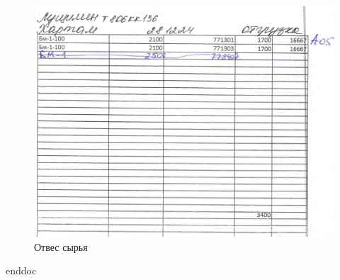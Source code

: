 \begin{figure}
\begin{center}
\includegraphics[height=0.94\textheight, width=\textwidth, angle=90, keepaspectratio]{Pics/f9.jpg}
\end{center}
\caption{Отвес сырья}
\label{pic:f9}
\end{figure}


\clearpage
 {enddoc}